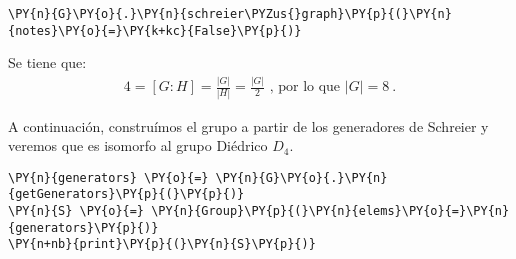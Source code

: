 \begin{enumerate}
    \begin{tcolorbox}[breakable, size=fbox, boxrule=1pt, pad at break*=1mm,colback=cellbackground, colframe=cellborder]
\begin{Verbatim}[commandchars=\\\{\}]
\PY{n}{G}\PY{o}{.}\PY{n}{schreier\PYZus{}graph}\PY{p}{(}\PY{n}{notes}\PY{o}{=}\PY{k+kc}{False}\PY{p}{)}
\end{Verbatim}
\end{tcolorbox}

    \begin{center}
    \end{center}
    
    
Se tiene que:
\begin{align*}
   4 =  [G:H] = \frac{|G|}{|H|} = \frac{|G|}{2} \text{ , por lo que } |G|=8 \: .
\end{align*}
    
\iffalse
    \begin{tcolorbox}[breakable, size=fbox, boxrule=1pt, pad at break*=1mm,colback=cellbackground, colframe=cellborder]
\prompt{In}{incolor}{5}{\boxspacing}
\begin{Verbatim}[commandchars=\\\{\}]
\PY{n}{generators} \PY{o}{=} \PY{n}{G}\PY{o}{.}\PY{n}{getGenerators}\PY{p}{(}\PY{p}{)}
\PY{n}{print\PYZus{}gens}\PY{p}{(}\PY{n}{generators}\PY{p}{)}
\end{Verbatim}
\end{tcolorbox}


\begin{tcolorbox}[breakable, size=fbox, boxrule=.5pt, pad at break*=1mm, opacityfill=0]
\prompt{Out}{outcolor}{5}{\boxspacing}
    \begin{Verbatim}[commandchars=\\\{\}]
g0 = (1, 2, 3, 4)
g1 = (2, 4)
    \end{Verbatim}
    \end{tcolorbox}
\fi

\newpage
A continuación, construímos el grupo a partir de los generadores de Schreier y veremos que es isomorfo al grupo Diédrico $D_4$.
    \begin{tcolorbox}[breakable, size=fbox, boxrule=1pt, pad at break*=1mm,colback=cellbackground, colframe=cellborder]
\begin{Verbatim}[commandchars=\\\{\}]
\PY{n}{generators} \PY{o}{=} \PY{n}{G}\PY{o}{.}\PY{n}{getGenerators}\PY{p}{(}\PY{p}{)}
\PY{n}{S} \PY{o}{=} \PY{n}{Group}\PY{p}{(}\PY{n}{elems}\PY{o}{=}\PY{n}{generators}\PY{p}{)}
\PY{n+nb}{print}\PY{p}{(}\PY{n}{S}\PY{p}{)}
\end{Verbatim}
\end{tcolorbox}


\end{enumerate}
